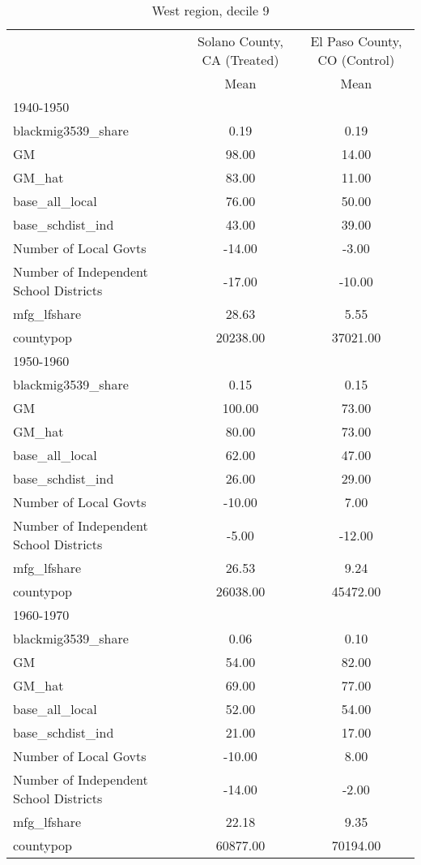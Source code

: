 \begin{table}[htbp]\centering
\def\sym#1{\ifmmode^{#1}\else\(^{#1}\)\fi}
\caption{West region, decile 9 \label{tab1}}
\begin{tabular}{l*{2}{c}}
\toprule
                    &\multicolumn{1}{c}{Solano County, CA (Treated)}&\multicolumn{1}{c}{El Paso County, CO (Control)}\\
                    &        Mean&        Mean\\
\midrule
1940-1950           &            &            \\
blackmig3539\_share  &        0.19&        0.19\\
GM                  &       98.00&       14.00\\
GM\_hat              &       83.00&       11.00\\
base\_all\_local      &       76.00&       50.00\\
base\_schdist\_ind    &       43.00&       39.00\\
Number of Local Govts&      -14.00&       -3.00\\
Number of Independent School Districts&      -17.00&      -10.00\\
mfg\_lfshare         &       28.63&        5.55\\
countypop           &    20238.00&    37021.00\\
\midrule
1950-1960           &            &            \\
blackmig3539\_share  &        0.15&        0.15\\
GM                  &      100.00&       73.00\\
GM\_hat              &       80.00&       73.00\\
base\_all\_local      &       62.00&       47.00\\
base\_schdist\_ind    &       26.00&       29.00\\
Number of Local Govts&      -10.00&        7.00\\
Number of Independent School Districts&       -5.00&      -12.00\\
mfg\_lfshare         &       26.53&        9.24\\
countypop           &    26038.00&    45472.00\\
\midrule
1960-1970           &            &            \\
blackmig3539\_share  &        0.06&        0.10\\
GM                  &       54.00&       82.00\\
GM\_hat              &       69.00&       77.00\\
base\_all\_local      &       52.00&       54.00\\
base\_schdist\_ind    &       21.00&       17.00\\
Number of Local Govts&      -10.00&        8.00\\
Number of Independent School Districts&      -14.00&       -2.00\\
mfg\_lfshare         &       22.18&        9.35\\
countypop           &    60877.00&    70194.00\\
\bottomrule
\end{tabular}
\end{table}
